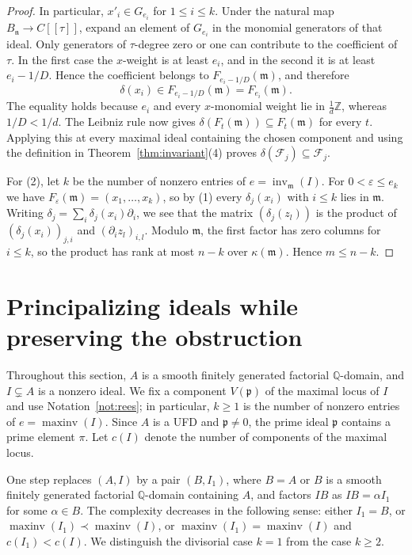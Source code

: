 \documentclass[11pt]{amsart}
\numberwithin{equation}{section}
\theoremstyle{definition}
\newcommand{\Q}{\mathbb{Q}}
\newcommand{\Z}{\mathbb{Z}}
\newcommand{\fm}{\mathfrak{m}}
\newcommand{\fn}{\mathfrak{n}}
\newcommand{\fp}{\mathfrak{p}}
\newcommand{\cF}{\mathcal{F}}
\DeclareMathOperator{\inv}{inv}
\DeclareMathOperator{\maxinv}{maxinv}
\begin{document}
\begin{proof}
In particular, $x'_i\in G_{e_i}$ for $1\le i\le k$. Under the natural map $B_\fn\to C[[\tau]]$, expand an element of $G_{e_i}$ in the monomial generators of that ideal. Only generators of $\tau$-degree zero or one can contribute to the coefficient of $\tau$. In the first case the $x$-weight is at least $e_i$, and in the second it is at least $e_i-1/D$. Hence the coefficient belongs to $F_{e_i-1/D}(\fm)$, and therefore
\[
  \delta(x_i)\in F_{e_i-1/D}(\fm)=F_{e_i}(\fm).
\]
The equality holds because $e_i$ and every $x$-monomial weight lie in $\frac1d\Z$, whereas $1/D<1/d$. The Leibniz rule now gives $\delta(F_t(\fm))\subseteq F_t(\fm)$ for every $t$. Applying this at every maximal ideal containing the chosen component and using the definition in Theorem~\ref{thm:invariant}(4) proves $\delta(\cF_j)\subseteq\cF_j$.

For (2), let $k$ be the number of nonzero entries of $e=\inv_\fm(I)$. For $0<\varepsilon\le e_k$ we have $F_\varepsilon(\fm)=(x_1,\ldots,x_k)$, so by (1) every $\delta_j(x_i)$ with $i\le k$ lies in $\fm$. Writing $\delta_j=\sum_i\delta_j(x_i)\partial_i$, we see that the matrix $(\delta_j(z_l))$ is the product of $(\delta_j(x_i))_{j,i}$ and $(\partial_iz_l)_{i,l}$. Modulo $\fm$, the first factor has zero columns for $i\le k$, so the product has rank at most $n-k$ over $\kappa(\fm)$. Hence $m\le n-k$.
\end{proof}

\section{Principalizing ideals while preserving the obstruction}
\label{sec:principalization}

Throughout this section, $A$ is a smooth finitely generated factorial $\Q$-domain, and $I\subsetneq A$ is a nonzero ideal. We fix a component $V(\fp)$ of the maximal locus of $I$ and use Notation~\ref{not:rees}; in particular, $k\ge1$ is the number of nonzero entries of $e=\maxinv(I)$. Since $A$ is a UFD and $\fp\ne0$, the prime ideal $\fp$ contains a prime element $\pi$. Let $c(I)$ denote the number of components of the maximal locus.

One step replaces $(A,I)$ by a pair $(B,I_1)$, where $B=A$ or $B$ is a smooth finitely generated factorial $\Q$-domain containing $A$, and factors $IB$ as $IB=\alpha I_1$ for some $\alpha\in B$. The complexity decreases in the following sense: either $I_1=B$, or $\maxinv(I_1)\prec\maxinv(I)$, or $\maxinv(I_1)=\maxinv(I)$ and $c(I_1)<c(I)$. We distinguish the divisorial case $k=1$ from the case $k\ge2$.
\end{document}
